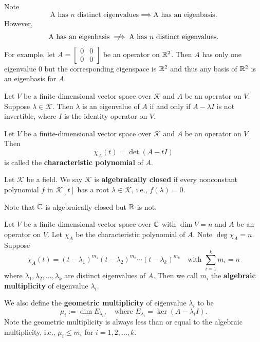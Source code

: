     \begin{remarkenv}
        Note
        $$ \text{A has } n \text{ distinct eigenvalues} \implies \text{A has an eigenbasis}.$$
        However,
        $$ \text{A has an eigenbasis} \centernot\implies \text{A has } n \text{ distinct eigenvalues}. $$
        For example, let $A = \begin{bmatrix}
            0 & 0 \\
            0 & 0
        \end{bmatrix}$ be an operator on $\mathbb{R}^2$. Then $A$ has only one eigenvalue $0$ but the corresponding eigenspace is $\mathbb{R}^2$ and thus any basis of $\mathbb{R}^2$ is an eigenbasis for $A$.
    \end{remarkenv}
    \begin{theoremenv}
        Let $V$ be a finite-dimensional vector space over $\mathcal{K}$ and $A$ be an operator on $V$. Suppose $\lambda \in \mathcal{K}$. Then $\lambda$ is an eigenvalue of $A$ if and only if $A-\lambda I$ is not invertible, where $I$ is the identity operator on $V$.
    \end{theoremenv}
    \begin{definitionenv}
        Let $V$ be a finite-dimensional vector space over $\mathcal{K}$ and $A$ be an operator on $V$. Then
        $$ \chi_A(t) = \det(A-tI) $$
        is called the \textbf{characteristic polynomial} of $A$.
    \end{definitionenv}
    \begin{definitionenv}
        Let $\mathcal{K}$ be a field. We say $\mathcal{K}$ is \textbf{algebraically closed} if every nonconstant polynomial $f$ in $\mathcal{K}[t]$ has a root $\lambda\in \mathcal{K}$, i.e., $f(\lambda) = 0$. 
    \end{definitionenv}
    \begin{remarkenv}
        Note that $\mathbb{C}$ is algebraically closed but $\mathbb{R}$ is not.
    \end{remarkenv}
    \begin{definitionenv}
        Let $V$ be a finite-dimensional vector space over $\mathcal{\mathbb{C}}$ with $\dim V = n$ and $A$ be an operator on $V$. Let $\chi_A$ be the characteristic polynomial of $A$. Note $\deg \chi_A = n$. Suppose $$\chi_A(t) = (t-\lambda_1)^{m_1} (t-\lambda_2)^{m_2} \cdots (t-\lambda_k)^{m_k}\quad \text{with } \sum_{i=1}^k m_i = n $$ where $\lambda_1, \lambda_2, \ldots, \lambda_k$ are distinct eigenvalues of $A$. Then we call $m_i$ the \textbf{algebraic multiplicity} of eigenvalue $\lambda_i$.
        
        We also define the \textbf{geometric multiplicity} of eigenvalue $\lambda_i$ to be $$\mu_i := \dim E_{\lambda_i}, \quad \text{where } E_{\lambda_i} = \ker(A-\lambda_i I).$$
        Note the geometric multiplicity is always less than or equal to the algebraic multiplicity, i.e., $\mu_i \le m_i$ for $i=1,2,\ldots,k$.
    \end{definitionenv}
